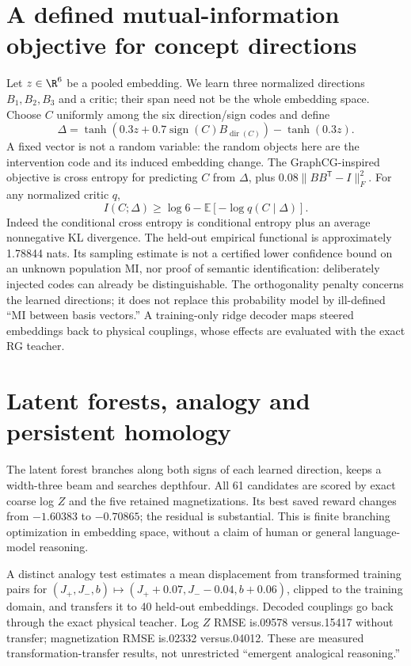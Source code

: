 \documentclass[11pt,oneside,openany]{book}
\theoremstyle{definition}\newtheorem{definition}[theorem]{Definition}
\theoremstyle{remark}\newtheorem{remark}[theorem]{Remark}
\begin{document}
\section{A defined mutual-information objective for concept directions}
Let $ z\in\R^6$ be a pooled embedding. We learn three normalized directions
$ B_1,B_2,B_3$ and a critic; their span need not be the whole embedding space.
Choose $ C $ uniformly among the six direction/sign codes and define
\[
 \Delta=\tanh(0.3 z+0.7\operatorname{sign}(C)B_{\operatorname{dir}(C)})
             -\tanh(0.3 z).
\]
A fixed vector is not a random variable: the random objects here are the
intervention code and its induced embedding change. The GraphCG-inspired
\cite{QGraphCG} objective is cross entropy for predicting $ C $ from $\Delta $,
plus $0.08\|BB^{\mathsf{T}}-I\|_F^2$. For any normalized critic $ q $,
\[
 I(C;\Delta)\ge\log 6-\mathbb E[-\log q(C\mid\Delta)].
\]
Indeed the conditional cross entropy is conditional entropy plus an
average nonnegative KL divergence. The held-out empirical functional is
approximately 1.78844 nats. Its sampling estimate is not a certified lower
confidence bound on an unknown population MI, nor proof of semantic
identification: deliberately injected codes can already be distinguishable.
The orthogonality penalty concerns the learned directions; it does not
replace this probability model by ill-defined ``MI between basis vectors.''
A training-only ridge decoder maps steered embeddings back to physical
couplings, whose effects are evaluated with the exact RG teacher.

\section{Latent forests, analogy and persistent homology}
The latent forest branches along both signs of each learned direction,
keeps a width-three beam and searches depthfour. All 61 candidates are scored
by exact coarse log $ Z $ and the five retained magnetizations. Its best saved
reward changes from $-1.60383$ to $-0.70865$; the residual is substantial.
This is finite branching optimization in embedding space, without a claim
of human or general language-model reasoning.

A distinct analogy test estimates a mean displacement from transformed
training pairs for $(J_+,J_-,b)\mapsto(J_++0.07,J_--0.04,b+0.06)$, clipped
to the training domain, and transfers it to 40 held-out embeddings. Decoded
couplings go back through the exact physical teacher. Log $ Z $ RMSE is.09578
versus.15417 without transfer; magnetization RMSE is.02332 versus.04012.
These are measured transformation-transfer results, not unrestricted
``emergent analogical reasoning.''
\end{document}
